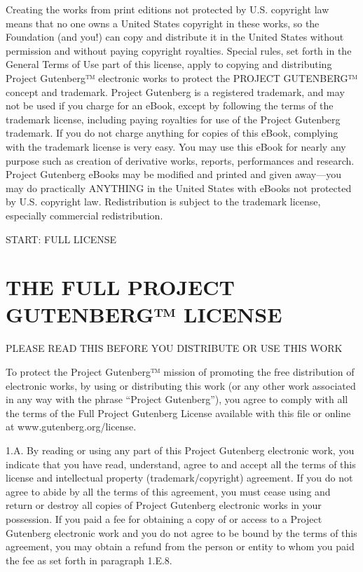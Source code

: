 \documentclass[12pt,openright]{book}
\begin{document}
Creating the works from print editions not protected by U.S. copyright law means that no one owns a United States copyright in these works, so the Foundation (and you!) can copy and distribute it in the United States without permission and without paying copyright royalties. Special rules, set forth in the General Terms of Use part of this license, apply to copying and distributing Project Gutenberg™ electronic works to protect the PROJECT GUTENBERG™ concept and trademark. Project Gutenberg is a registered trademark, and may not be used if you charge for an eBook, except by following the terms of the trademark license, including paying royalties for use of the Project Gutenberg trademark. If you do not charge anything for copies of this eBook, complying with the trademark license is very easy. You may use this eBook for nearly any purpose such as creation of derivative works, reports, performances and research. Project Gutenberg eBooks may be modified and printed and given away—you may do practically ANYTHING in the United States with eBooks not protected by U.S. copyright law. Redistribution is subject to the trademark license, especially commercial redistribution.

START: FULL LICENSE

\chapter*{THE FULL PROJECT GUTENBERG™ LICENSE}

\noindent PLEASE READ THIS BEFORE YOU DISTRIBUTE OR USE THIS WORK

To protect the Project Gutenberg™ mission of promoting the free distribution of electronic works, by using or distributing this work (or any other work associated in any way with the phrase “Project Gutenberg”), you agree to comply with all the terms of the Full Project Gutenberg License available with this file or online at www.gutenberg.org/license.

1.A. By reading or using any part of this Project Gutenberg electronic work, you indicate that you have read, understand, agree to and accept all the terms of this license and intellectual property (trademark/copyright) agreement. If you do not agree to abide by all the terms of this agreement, you must cease using and return or destroy all copies of Project Gutenberg electronic works in your possession. If you paid a fee for obtaining a copy of or access to a Project Gutenberg electronic work and you do not agree to be bound by the terms of this agreement, you may obtain a refund from the person or entity to whom you paid the fee as set forth in paragraph 1.E.8.
\end{document}
